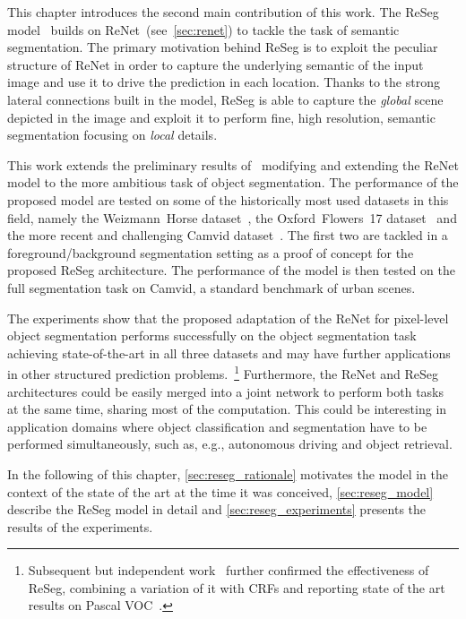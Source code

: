 This chapter introduces the second main contribution of this work. The ReSeg
model~\cite{Visin_2016_CVPR_Workshops} builds on
ReNet~(see~\autoref{sec:renet}) to tackle the task of semantic segmentation.
The primary motivation behind ReSeg is to exploit the peculiar structure of
ReNet in order to capture the underlying semantic of the input image and use it
to drive the prediction in each location. Thanks to the strong lateral
connections built in the model, ReSeg is able to capture the \emph{global}
scene depicted in the image and exploit it to perform fine, high resolution,
semantic segmentation focusing on \emph{local} details.

This work extends the preliminary results of~\cite{visin2015renet} modifying
and extending the ReNet model to the more ambitious task of object
segmentation. The performance of the proposed model are tested on some of the
historically most used datasets in this field, namely the Weizmann~Horse
dataset~\cite{Borenstein04combiningtop-down}, the Oxford~Flowers~17
dataset~\cite{Nilsback06} and the more recent and challenging Camvid
dataset~\citep{Brostow2010semantic,BrostowECCV08}. The first two are
tackled in a foreground/background segmentation setting as a proof of concept
for the proposed ReSeg architecture. The performance of the model is then
tested on the full segmentation task on Camvid, a standard benchmark of urban
scenes.

The experiments show that the proposed adaptation of the ReNet for pixel-level
object segmentation performs successfully on the object segmentation task
achieving state-of-the-art in all three datasets and may have further
applications in other structured prediction problems.~\footnote{
    Subsequent but independent work~\cite{DBLP:journals/corr/YanZJBY16} further
    confirmed the effectiveness of ReSeg, combining a variation of it with CRFs
    and reporting state of the art results on Pascal VOC~\cite{Everingham15}.}
Furthermore, the ReNet and ReSeg architectures could be easily merged into a
joint network to perform both tasks at the same time, sharing most of the
computation. This could be interesting in application domains where object
classification and segmentation have to be performed simultaneously, such as,
e.g., autonomous driving and object retrieval.

In the following of this chapter, \autoref{sec:reseg_rationale} motivates the
model in the context of the state of the art at the time it was conceived,
\autoref{sec:reseg_model} describe the ReSeg model in detail and
\autoref{sec:reseg_experiments} presents the results of the experiments.


